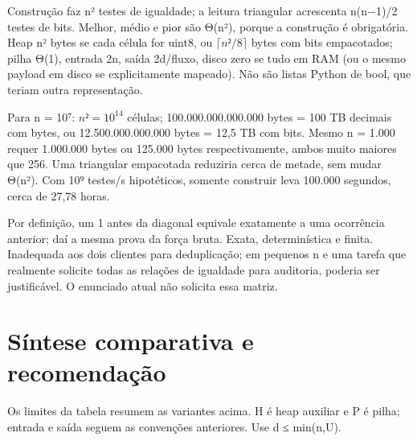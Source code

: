 \documentclass[
  brazilian,
  11pt,
  a4paper,
]{article}
\let\oldsection\section
\renewcommand{\section}{\Needspace{6\baselineskip}\oldsection}
\begin{document}
Construção faz n² testes de igualdade; a leitura triangular acrescenta
n(n−1)/2 testes de bits. Melhor, médio e pior são Θ(n²), porque a
construção é obrigatória. Heap n² bytes se cada célula for uint8, ou
\(\lceil n²/8\rceil\) bytes com bits empacotados; pilha Θ(1), entrada
2n, saída 2d/fluxo, disco zero se tudo em RAM (ou o mesmo payload em
disco se explicitamente mapeado). Não são listas Python de bool, que
teriam outra representação.

Para n = 10⁷: \(n²=10^{14}\) células; 100.000.000.000.000 bytes = 100 TB
decimais com bytes, ou 12.500.000.000.000 bytes = 12,5 TB com bits.
Mesmo n = 1.000 requer 1.000.000 bytes ou 125.000 bytes respectivamente,
ambos muito maiores que 256. Uma triangular empacotada reduziria cerca
de metade, sem mudar Θ(n²). Com 10⁹ testes/s hipotéticos, somente
construir leva 100.000 segundos, cerca de 27,78 horas.

Por definição, um 1 antes da diagonal equivale exatamente a uma
ocorrência anterior; daí a mesma prova da força bruta. Exata,
determinística e finita. Inadequada aos dois clientes para deduplicação;
em pequenos n e uma tarefa que realmente solicite todas as relações de
igualdade para auditoria, poderia ser justificável. O enunciado atual
não solicita essa matriz.

\section{Síntese comparativa e
recomendação}\label{suxedntese-comparativa-e-recomendauxe7uxe3o}

Os limites da tabela resumem as variantes acima. H é heap auxiliar e P é
pilha; entrada e saída seguem as convenções anteriores. Use d ≤
min(n,U).
\end{document}
